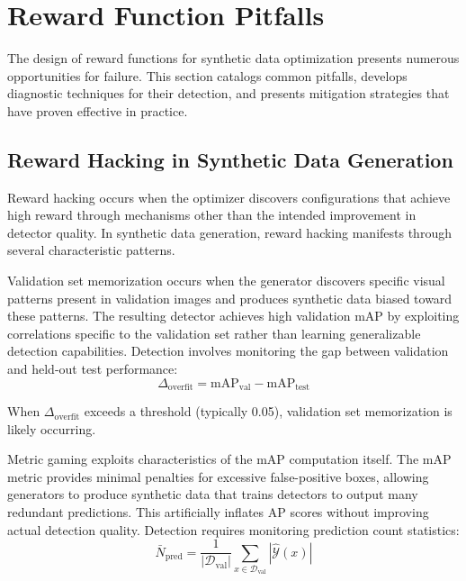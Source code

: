 \section{Reward Function Pitfalls}
\label{sec:pitfalls}

The design of reward functions for synthetic data optimization presents numerous opportunities for failure. This section catalogs common pitfalls, develops diagnostic techniques for their detection, and presents mitigation strategies that have proven effective in practice.

\subsection{Reward Hacking in Synthetic Data Generation}

Reward hacking occurs when the optimizer discovers configurations that achieve high reward through mechanisms other than the intended improvement in detector quality. In synthetic data generation, reward hacking manifests through several characteristic patterns.

Validation set memorization occurs when the generator discovers specific visual patterns present in validation images and produces synthetic data biased toward these patterns. The resulting detector achieves high validation mAP by exploiting correlations specific to the validation set rather than learning generalizable detection capabilities. Detection involves monitoring the gap between validation and held-out test performance:
\begin{equation}
\Delta_{\text{overfit}} = \text{mAP}_{\text{val}} - \text{mAP}_{\text{test}}
\label{eq:overfit_gap}
\end{equation}

When $\Delta_{\text{overfit}}$ exceeds a threshold (typically 0.05), validation set memorization is likely occurring.

Metric gaming exploits characteristics of the mAP computation itself. The mAP metric provides minimal penalties for excessive false-positive boxes, allowing generators to produce synthetic data that trains detectors to output many redundant predictions. This artificially inflates AP scores without improving actual detection quality. Detection requires monitoring prediction count statistics:
\begin{equation}
\bar{N}_{\text{pred}} = \frac{1}{|\mathcal{D}_{\text{val}}|} \sum_{x \in \mathcal{D}_{\text{val}}} |\hat{\mathcal{Y}}(x)|
\label{eq:prediction_count}
\end{equation}


